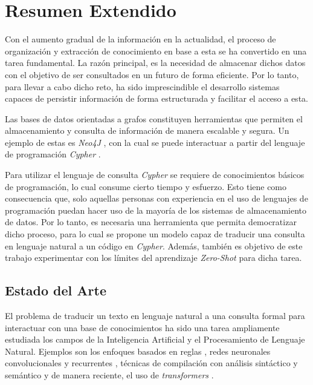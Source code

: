 \documentclass[a4paper,10pt,twocolumn]{article}
\begin{document}
\section{Resumen Extendido}\label{sec:intro}
Con el aumento gradual de la información en la actualidad, el proceso de organización y extracción de conocimiento en base a esta se ha convertido en una tarea fundamental. La razón principal, es la necesidad de almacenar dichos datos con el objetivo de ser consultados en un futuro de forma eficiente. Por lo tanto, para llevar a cabo dicho reto, ha sido imprescindible el desarrollo sistemas capaces de persistir información de forma estructurada y facilitar el acceso a esta.

Las bases de datos orientadas a grafos \cite{graph_dbs} constituyen herramientas que permiten el almacenamiento y consulta de información de manera escalable y segura. Un ejemplo de estas es \textit{Neo4J} \cite{neo4j}, con la cual se puede interactuar a partir del lenguaje de programación \textit{Cypher} \cite{cypher}.

Para utilizar el lenguaje de consulta \textit{Cypher} se requiere de conocimientos básicos de programación, lo cual consume cierto tiempo y esfuerzo. Esto tiene como consecuencia que, solo aquellas personas con experiencia en el uso de lenguajes de programación puedan hacer uso de la mayoría de los sistemas de almacenamiento de datos. Por lo tanto, es necesaria una herramienta que permita democratizar dicho proceso, para lo cual se propone un modelo capaz de traducir una consulta en lenguaje natural a un código en \textit{Cypher}. Además, también es objetivo de este trabajo experimentar con los límites del aprendizaje \textit{Zero-Shot} \cite{zeroshot} para dicha tarea. 

\subsection{Estado del Arte}
El problema de traducir un texto en lenguaje natural a una consulta formal para interactuar con una base de conocimientos ha sido una tarea ampliamente estudiada los campos de la Inteligencia Artificial y el Procesamiento de Lenguaje Natural. Ejemplos son los enfoques basados en reglas \cite{rba1}, redes neuronales convolucionales y recurrentes \cite{rnc} \cite{rnr}, técnicas de compilación con análisis sintáctico y semántico \cite{comp} y de manera reciente, el uso de \textit{transformers} \cite{transformers}. 
\end{document}
